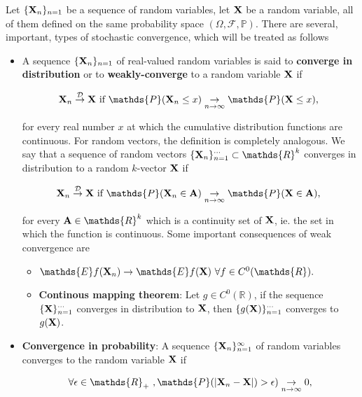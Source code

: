 \documentclass{homework}
\begin{document}
Let $\{{\bf X}_n\}_{n=1}$ be a sequence of random variables, let ${\bf X}$ be a random variable, all of them defined on the same probability space $(\Omega, \mathcal{F}, \mathds{P})$. There are several, important, types of stochastic convergence, which will be treated as follows\\

\begin{itemize}
    \item A sequence $\{{\bf X}_n\}_{n=1}$ of real-valued random variables is said to \textbf{converge in distribution} or to \textbf{weakly-converge} to a random variable ${\bf X}$ if 
    
    $$
    \X_n \overset{\mathcal{D}}{\rightarrow} \X \textnormal{ if }\mathds{P}(\X_n \leq x) \underset{n \rightarrow \infty}{\rightarrow} \mathds{P}(\X \leq x)\textnormal{, } 
    $$
    
    for every real number $x$ at which the cumulative distribution functions are continuous. For random vectors, the definition is completely analogous. We say that a sequence of random vectors $\{\X_{n}\}_{n=1}^{\cdots} \subset \mathds{R}^k$ converges in distribution to a random $k$-vector ${\bf X}$ if
    
    $$
    \X_n \overset{\mathcal{D}}{\rightarrow} \X \textnormal{ if }\mathds{P}(\X_n \in {\bf A}) \underset{n \rightarrow \infty}{\rightarrow} \mathds{P}(\X \in {\bf A})\textnormal{, } 
    $$
    
    for every $ {\bf A} \in \mathds{R}^k$ which is a continuity set of ${\bf X}$, ie. the set in which the function is continuous. Some important consequences of weak convergence are
    
    \begin{itemize}
        \item $\mathds{E}f(\X_n) \rightarrow\mathds{E}f(\X) \textnormal{ } \forall f\in C^{0}(\mathds{R}).$ \\
        \item \textbf{Continous mapping theorem}: Let $g \in C^{0}(\mathds{R})$, if the sequence $\{{\bf X}\}_{n=1}^{\cdots}$ converges in distribution to ${\bf X}$, then $\{g({\bf X})\}_{n=1}^{\cdots}$ converges to $g({\bf X})$. \\
    \end{itemize}
    \item \textbf{Convergence in probability}: A sequence $\{{\bf X}_n\}_{n=1}^{\infty}$ of random variables converges to the random variable ${\bf X}$ if 
    
    $$
    \forall \epsilon \in \mathds{R}_+ \textnormal{ }, \mathds{P}(|\X_n - \X|) > \epsilon) \underset{n \rightarrow \infty}{\rightarrow} 0,
    $$
    

\end{itemize}
\end{document}

